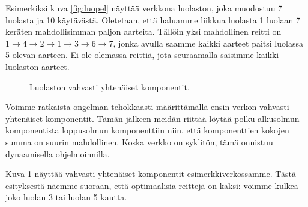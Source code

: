 Esimerkiksi kuva \ref{fig:luopel} näyttää verkkona luolaston, joka muodostuu
7 luolasta ja 10 käytävästä.
Oletetaan, että haluamme liikkua luolasta 1 luolaan 7
keräten mahdollisimman paljon aarteita.
Tällöin yksi mahdollinen reitti on
$1 \rightarrow 4 \rightarrow 2 \rightarrow 1 \rightarrow 3 \rightarrow 6 \rightarrow 7$,
jonka avulla saamme kaikki aarteet paitsi luolassa 5 olevan aarteen.
Ei ole olemassa reittiä, jota seuraamalla saisimme kaikki luolaston aarteet.

\begin{figure}
\center
\begin{center}
\end{center}
\caption{Luolaston vahvasti yhtenäiset komponentit.}
\label{fig:luovah}
\end{figure}

Voimme ratkaista ongelman tehokkaasti määrittämällä ensin verkon
vahvasti yhtenäiset komponentit.
Tämän jälkeen meidän riittää löytää polku alkusolmun komponentista
loppusolmun komponenttiin niin, että komponenttien kokojen summa
on suurin mahdollinen.
Koska verkko on syklitön, tämä onnistuu dynaamisella ohjelmoinnilla.

Kuva \ref{fig:luovah} näyttää vahvasti yhtenäiset komponentit
esimerkkiverkossamme.
Tästä esityksestä näemme suoraan, että optimaalisia reittejä on kaksi:
voimme kulkea joko luolan 3 tai luolan 5 kautta.